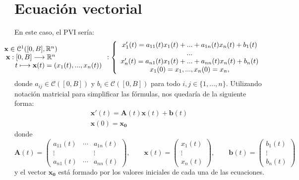 \section{Ecuación vectorial}
En este caso, el PVI sería:
\begin{equation}\label{eq:vect}
 \hspace*{-3cm} 	\begin{array}{c} \textbf{x} \in \mathcal{C}^1([0,B],\R^n) \\ \textbf{x}:[0,B] \longrightarrow \R^n \\ \qquad \qquad \qquad \qquad t \longmapsto \textbf{x}(t) = (x_1(t),...,x_n(t)) \end{array}:\left\lbrace\begin{array}{c} x_1'(t) = a_{11}(t)x_1(t)+...+a_{1n}(t)x_n(t)+b_1(t) \\ ... \\ x_n'(t) = a_{n1}(t)x_1(t)+...+a_{nn}(t)x_n(t)+b_n(t) \\ x_1(0) = x_1,...,x_n(0) =x_n, \end{array}\right.
\end{equation}
donde $a_{ij} \in \mathcal{C}([0,B])$ y $b_i \in \mathcal{C}([0,B])$ para todo $i,j \in \{1,...,n\}$. Utilizando notación matricial para simplificar las fórmulas, nos quedaría de la siguiente forma:
\begin{equation}
	\begin{array}{c}
		\textbf{x}'(t) = \textbf{A}(t)\textbf{x}(t)+\textbf{b}(t) \\ \textbf{x}(0) = \textbf{x}_\textbf{0}
	\end{array}
\end{equation}
donde
\begin{equation}
	\textbf{A}(t) = \begin{pmatrix}
		a_{11}(t) & \cdots & a_{1n}(t)\\ 
		\vdots & & \vdots \\
		a_{n1}(t) & \cdots & a_{nn}(t)
	\end{pmatrix}, \qquad \textbf{x}(t) = \begin{pmatrix}
	x_1(t) \\ \vdots \\ x_n(t)
	\end{pmatrix}, \qquad \textbf{b}(t) = \begin{pmatrix}
	b_1(t) \\ \vdots \\ b_n(t)
	\end{pmatrix}
\end{equation}
y el vector $\textbf{x}_\textbf{0}$ está formado por los valores iniciales de cada una de las ecuaciones.

